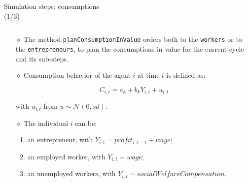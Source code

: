 \documentclass[9pt]{beamer}
\begin{document}
\begin{frame}[fragile]{Simulation steps: consumptions\\(1/3)}

\begin{columns}[T]
\begin{column}{.7\textwidth}
\begin{block}{}

\begin{itemize}

\item[$\diamond$] The method \verb"planConsumptionInValue" orders both to the \verb"workers" or to the \verb"entrepreneurs", to plan the consumptions in value for the current cycle and its sub-steps.

\item[$\diamond$] Consumption behavior of the agent $i$ at time $t$ is defined as:

\begin{equation}
C_{i,t} = a_k + b_k Y_{i,t} + u_{i,t}
\end{equation}

with $u_{i,t}$ from $u\sim\mathcal{N}(0,sd)$.

\item[$\diamond$] The individual $i$ can be:
\begin{enumerate}
\item
an entrepreneur, with $Y_{i,t} = profit_{i,t-1}+wage$; 
\item 
an employed worker, with $Y_{i,t} = wage$; 
\item
an unemployed workers, with $Y_{i,t} = socialWelfareCompensation$.
\end{enumerate}

\end{itemize}
     
\end{block}
\end{column}


\end{columns}
\end{frame}
\end{document}
